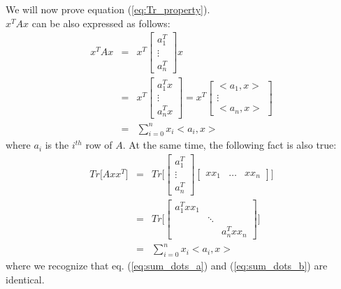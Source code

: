 \documentclass{article}
\begin{document}
We will now prove equation (\ref{eq:Tr_property}).
\\
$x^T A x$ can be also expressed as follows:
\begin{eqnarray}
x^T A x &=& x^T \begin{bmatrix} 
a_1^T \\
\vdots \\ 
a_n^T
\end{bmatrix} x \\
&=&
x^T \begin{bmatrix} 
a_1^T x \\
\vdots \\ 
a_n^T x
\end{bmatrix} = x^T \begin{bmatrix} 
<a_1, x> \\
\vdots \\ 
<a_n, x>
\end{bmatrix} \\
&=&
\sum_{i = 0}^n x_i <a_i, x>
\label{eq:sum_dots_a}
\end{eqnarray}
where $a_i$ is the $i^{th}$ row of $A$.
At the same time, the following fact is also true:
\begin{eqnarray}
Tr \bigg [ A x x^T \bigg ] &=& 
Tr \bigg [
\begin{bmatrix} a_1^T \\ \vdots \\ a_n^T \end{bmatrix}
\begin{bmatrix} xx_1 & \hdots & xx_n \end{bmatrix}
\bigg ]  \\
&=&
Tr \bigg [
\begin{bmatrix} 
a_1^T xx_1 & & \\
& \ddots & \\
& & a_n^T xx_n
\end{bmatrix}
\bigg ] \\
&=&
\sum_{i = 0}^n x_i <a_i, x>
\label{eq:sum_dots_b}
\end{eqnarray}
where we recognize that eq. (\ref{eq:sum_dots_a}) and (\ref{eq:sum_dots_b}) are identical.



\end{document}
